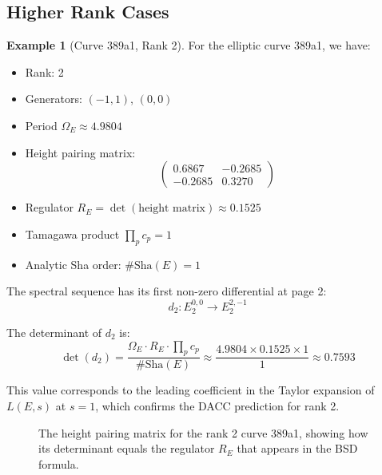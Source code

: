 \documentclass{article}
\theoremstyle{plain}
\theoremstyle{definition}
\newtheorem{example}[theorem]{Example}
\theoremstyle{remark}
\begin{document}
\subsection{Higher Rank Cases}

\begin{example}[Curve 389a1, Rank 2]
For the elliptic curve 389a1, we have:
\begin{itemize}
\item Rank: 2
\item Generators: $(-1,1)$, $(0,0)$
\item Period $\Omega_E \approx 4.9804$
\item Height pairing matrix:
$$\begin{pmatrix} 0.6867 & -0.2685 \\ -0.2685 & 0.3270 \end{pmatrix}$$
\item Regulator $R_E = \det(\text{height matrix}) \approx 0.1525$
\item Tamagawa product $\prod_p c_p = 1$
\item Analytic Sha order: $\#\text{Sha}(E) = 1$
\end{itemize}

The spectral sequence has its first non-zero differential at page 2:
$$d_2: E_2^{0,0} \to E_2^{2,-1}$$

The determinant of $d_2$ is:
$$\det(d_2) = \frac{\Omega_E \cdot R_E \cdot \prod_p c_p}{\#\text{Sha}(E)} \approx \frac{4.9804 \times 0.1525 \times 1}{1} \approx 0.7593$$

This value corresponds to the leading coefficient in the Taylor expansion of $L(E,s)$ at $s=1$, which confirms the DACC prediction for rank 2.
\end{example}

\begin{figure}[htbp]
\centering
{}
\caption{The height pairing matrix for the rank 2 curve 389a1, showing how its determinant equals the regulator $R_E$ that appears in the BSD formula.}
\label{fig:rank2_height}
\end{figure}
\end{document}
